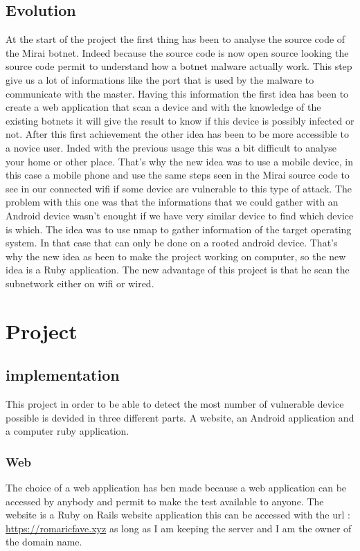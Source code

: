 \documentclass{report}
\begin{document}
\section{Evolution}
At the start of the project the first thing has been to analyse the source code of the Mirai botnet. Indeed because the source code is now open source looking the source code permit to understand how a botnet malware actually work. This step give us a lot of informations like the port that is used by the malware to communicate with the master.\newline
Having this information the first idea has been to create a web application that scan a device and with the knowledge of the existing botnets it will give the result to know if this device is possibly infected or not.\newline
After this first achievement the other idea has been to be more accessible to a novice user. Inded with the previous usage this was a bit difficult to analyse your home or other place.\newline
That's why the new idea was to use a mobile device, in this case a mobile phone and use the same steps seen in the Mirai source code to see in our connected wifi if some device are vulnerable to this type of attack.\newline
The problem with this one was that the informations that we could gather with an Android device wasn't enought if we have very similar device to find which device is which. The idea was to use nmap to gather information of the target operating system. In that case that can only be done on a rooted android device. That's why the new idea as been to make the project working on computer, so the new idea is a Ruby application. The new advantage of this project is that he scan the subnetwork either on wifi or wired.

\chapter{Project}
\section{implementation}
This project in order to be able to detect the most number of vulnerable device possible is devided in three different parts. A website, an Android application and a computer ruby application.
\subsection{Web}
The choice of a web application has ben made because a web application can be accessed by anybody and permit to make the test available to anyone. The website is a Ruby on Rails website application this can be accessed with the url : \url{https://romaricfave.xyz} as long as I am keeping the server and I am the owner of the domain name.\newline
\end{document}

